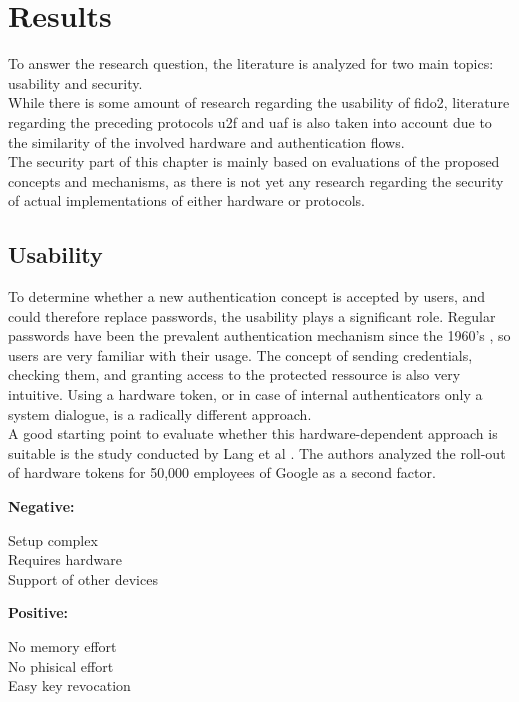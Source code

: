 
\section{Results}
\label{sec:results}

To answer the research question, the literature is analyzed for two main topics: usability and security.\\
While there is some amount of research regarding the usability of \ac{fido2}, literature regarding the preceding protocols \ac{u2f} and \ac{uaf} is also taken into account due to the similarity of the involved hardware and authentication flows.\\
The security part of this chapter is mainly based on evaluations of the proposed concepts and mechanisms, as there is not yet any research regarding the security of actual implementations of either hardware or protocols.

\subsection{Usability}
\label{subsec:usability}

To determine whether a new authentication concept is accepted by users, and could therefore replace passwords, the usability plays a significant role. Regular passwords have been the prevalent authentication mechanism since the 1960's \cite{mcmillan2012}, so users are very familiar with their usage. The concept of sending credentials, checking them, and granting access to the protected ressource is also very intuitive. Using a hardware token, or in case of internal authenticators only a system dialogue, is a radically different approach.\\
A good starting point to evaluate whether this hardware-dependent approach is suitable is the study conducted by Lang et al \cite{lang2017}. The authors analyzed the roll-out of hardware tokens for 50,000 employees of Google as a second factor.

\textbf{Negative:}
\begin{description}
    \item[Setup complex] 
    \item[Requires hardware] 
    \item[Support of other devices] 
\end{description}

\textbf{Positive:}
\begin{description}
    \item[No memory effort] 
    \item[No phisical effort] 
    \item[Easy key revocation] 
\end{description}

